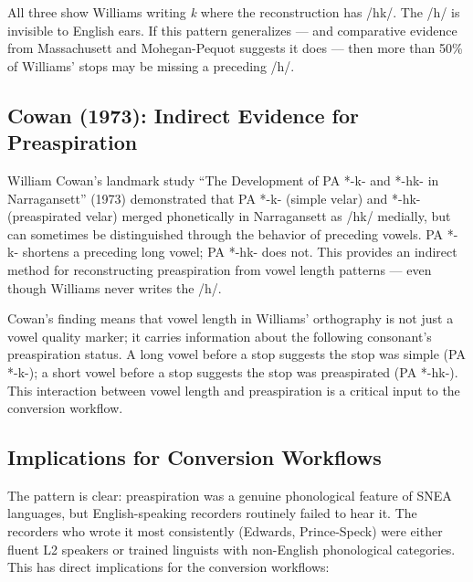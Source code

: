 All three show Williams writing \textit{k} where the reconstruction has /hk/.
The /h/ is invisible to English ears. If this pattern generalizes --- and
comparative evidence from Massachusett and Mohegan-Pequot suggests it does ---
then more than 50\% of Williams' stops may be missing a preceding /h/.

\subsection{Cowan (1973): Indirect Evidence for Preaspiration}

William Cowan's landmark study ``The Development of PA *-k- and *-hk- in
Narragansett'' (1973) demonstrated that PA *-k- (simple velar) and *-hk-
(preaspirated velar) merged phonetically in Narragansett as /hk/ medially,
but can sometimes be distinguished through the behavior of preceding vowels.
PA *-k- shortens a preceding long vowel; PA *-hk- does not. This provides an
indirect method for reconstructing preaspiration from vowel length patterns
--- even though Williams never writes the /h/.

Cowan's finding means that vowel length in Williams' orthography is not just
a vowel quality marker; it carries information about the following consonant's
preaspiration status. A long vowel before a stop suggests the stop was
simple (PA *-k-); a short vowel before a stop suggests the stop was
preaspirated (PA *-hk-). This interaction between vowel length and
preaspiration is a critical input to the conversion workflow.

\subsection{Implications for Conversion Workflows}

The pattern is clear: preaspiration was a genuine phonological feature of
SNEA languages, but English-speaking recorders routinely failed to hear it.
The recorders who wrote it most consistently (Edwards, Prince-Speck) were
either fluent L2 speakers or trained linguists with non-English phonological
categories. This has direct implications for the conversion workflows:

